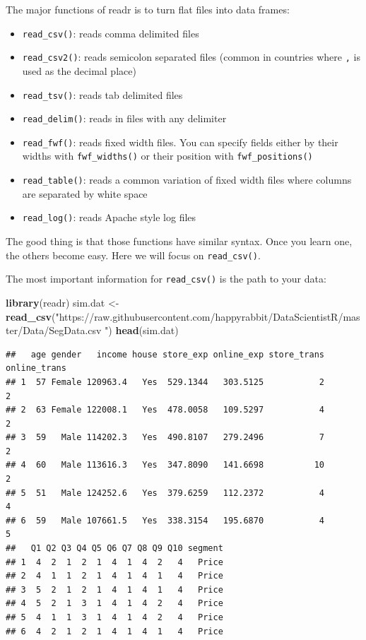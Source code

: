 \documentclass[]{book}
\newenvironment{Shaded}{\begin{snugshade}}{\end{snugshade}}
\newcommand{\KeywordTok}[1]{\textcolor[rgb]{0.13,0.29,0.53}{\textbf{{#1}}}}
\newcommand{\StringTok}[1]{\textcolor[rgb]{0.31,0.60,0.02}{{#1}}}
\newcommand{\NormalTok}[1]{{#1}}
\providecommand{\tightlist}{%
  \setlength{\itemsep}{0pt}\setlength{\parskip}{0pt}}
\theoremstyle{definition}
\theoremstyle{definition}
\theoremstyle{remark}
\begin{document}
The major functions of readr is to turn flat files into data frames:

\begin{itemize}
\tightlist
\item
  \texttt{read\_csv()}: reads comma delimited files
\item
  \texttt{read\_csv2()}: reads semicolon separated files (common in
  countries where \texttt{,} is used as the decimal place)
\item
  \texttt{read\_tsv()}: reads tab delimited files
\item
  \texttt{read\_delim()}: reads in files with any delimiter
\item
  \texttt{read\_fwf()}: reads fixed width files. You can specify fields
  either by their widths with \texttt{fwf\_widths()} or their position
  with \texttt{fwf\_positions()}\\
\item
  \texttt{read\_table()}: reads a common variation of fixed width files
  where columns are separated by white space
\item
  \texttt{read\_log()}: reads Apache style log files
\end{itemize}

The good thing is that those functions have similar syntax. Once you
learn one, the others become easy. Here we will focus on
\texttt{read\_csv()}.

The most important information for \texttt{read\_csv()} is the path to
your data:

\begin{Shaded}
\begin{Highlighting}[]
\KeywordTok{library}\NormalTok{(readr)}
\NormalTok{sim.dat <-}\StringTok{ }\KeywordTok{read_csv}\NormalTok{(}\StringTok{"https://raw.githubusercontent.com/happyrabbit/DataScientistR/master/Data/SegData.csv "}\NormalTok{)}
\KeywordTok{head}\NormalTok{(sim.dat)}
\end{Highlighting}
\end{Shaded}

\begin{verbatim}
##   age gender   income house store_exp online_exp store_trans online_trans
## 1  57 Female 120963.4   Yes  529.1344   303.5125           2            2
## 2  63 Female 122008.1   Yes  478.0058   109.5297           4            2
## 3  59   Male 114202.3   Yes  490.8107   279.2496           7            2
## 4  60   Male 113616.3   Yes  347.8090   141.6698          10            2
## 5  51   Male 124252.6   Yes  379.6259   112.2372           4            4
## 6  59   Male 107661.5   Yes  338.3154   195.6870           4            5
##   Q1 Q2 Q3 Q4 Q5 Q6 Q7 Q8 Q9 Q10 segment
## 1  4  2  1  2  1  4  1  4  2   4   Price
## 2  4  1  1  2  1  4  1  4  1   4   Price
## 3  5  2  1  2  1  4  1  4  1   4   Price
## 4  5  2  1  3  1  4  1  4  2   4   Price
## 5  4  1  1  3  1  4  1  4  2   4   Price
## 6  4  2  1  2  1  4  1  4  1   4   Price
\end{verbatim}
\end{document}
